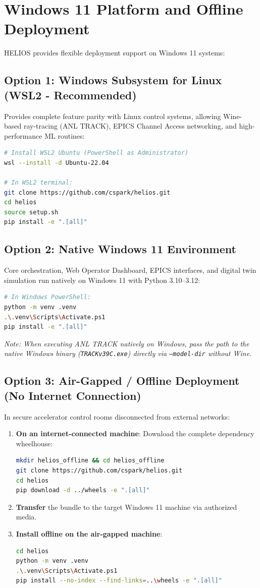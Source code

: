 \documentclass[11pt,a4paper]{report}
\begin{document}
\section{Windows 11 Platform and Offline Deployment}
HELIOS provides flexible deployment support on Windows 11 systems:

\subsection{Option 1: Windows Subsystem for Linux (WSL2 - Recommended)}
Provides complete feature parity with Linux control systems, allowing Wine-based ray-tracing (ANL TRACK), EPICS Channel Access networking, and high-performance ML routines:
\begin{lstlisting}[language=bash]
# Install WSL2 Ubuntu (PowerShell as Administrator)
wsl --install -d Ubuntu-22.04

# In WSL2 terminal:
git clone https://github.com/cspark/helios.git
cd helios
source setup.sh
pip install -e ".[all]"
\end{lstlisting}

\subsection{Option 2: Native Windows 11 Environment}
Core orchestration, Web Operator Dashboard, EPICS interfaces, and digital twin simulation run natively on Windows 11 with Python 3.10--3.12:
\begin{lstlisting}[language=bash]
# In Windows PowerShell:
python -m venv .venv
.\.venv\Scripts\Activate.ps1
pip install -e ".[all]"
\end{lstlisting}
\textit{Note: When executing ANL TRACK natively on Windows, pass the path to the native Windows binary (\texttt{TRACKv39C.exe}) directly via \texttt{--model-dir} without Wine.}

\subsection{Option 3: Air-Gapped / Offline Deployment (No Internet Connection)}
In secure accelerator control rooms disconnected from external networks:
\begin{enumerate}
    \item \textbf{On an internet-connected machine}: Download the complete dependency wheelhouse:
\begin{lstlisting}[language=bash]
mkdir helios_offline && cd helios_offline
git clone https://github.com/cspark/helios.git
cd helios
pip download -d ../wheels -e ".[all]"
\end{lstlisting}
    \item \textbf{Transfer} the bundle to the target Windows 11 machine via authorized media.
    \item \textbf{Install offline on the air-gapped machine}:
\begin{lstlisting}[language=bash]
cd helios
python -m venv .venv
.\.venv\Scripts\Activate.ps1
pip install --no-index --find-links=..\wheels -e ".[all]"
\end{lstlisting}
\end{enumerate}
\end{document}
